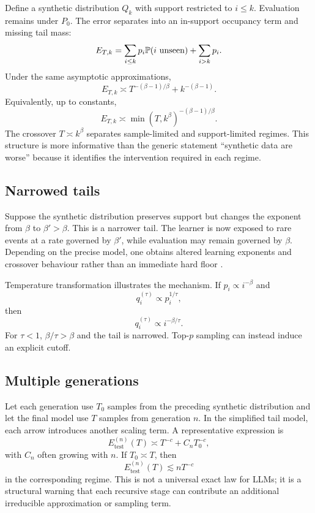 Define a synthetic distribution $Q_k$ with support restricted to $i\le k$. Evaluation remains under $P_0$. The error separates into an in-support occupancy term and missing tail mass:
\[
E_{T,k}
= \sum_{i\le k}p_i\mathbb{P}(i\text{ unseen})
+ \sum_{i>k}p_i.
\]
Under the same asymptotic approximations,
\[
E_{T,k}
\asymp T^{-(\beta-1)/\beta}
+ k^{-(\beta-1)}.
\]
Equivalently, up to constants,
\[
E_{T,k}
\asymp \min(T,k^\beta)^{-(\beta-1)/\beta}.
\]
The crossover $T\asymp k^\beta$ separates sample-limited and support-limited regimes. This structure is more informative than the generic statement ``synthetic data are worse'' because it identifies the intervention required in each regime.

\subsection{Narrowed tails}

Suppose the synthetic distribution preserves support but changes the exponent from $\beta$ to $\beta'>\beta$. This is a narrower tail. The learner is now exposed to rare events at a rate governed by $\beta'$, while evaluation may remain governed by $\beta$. Depending on the precise model, one obtains altered learning exponents and crossover behaviour rather than an immediate hard floor \citep{dohmatob2024tails}.

Temperature transformation illustrates the mechanism. If $p_i\propto i^{-\beta}$ and
\[
q_i^{(\tau)}\propto p_i^{1/\tau},
\]
then
\[
q_i^{(\tau)}\propto i^{-\beta/\tau}.
\]
For $\tau<1$, $\beta/\tau>\beta$ and the tail is narrowed. Top-$p$ sampling can instead induce an explicit cutoff.

\subsection{Multiple generations}

Let each generation use $T_0$ samples from the preceding synthetic distribution and let the final model use $T$ samples from generation $n$. In the simplified tail model, each arrow introduces another scaling term. A representative expression is
\[
E_{\mathrm{test}}^{(n)}(T)
\asymp T^{-c} + C_n T_0^{-c},
\]
with $C_n$ often growing with $n$. If $T_0\asymp T$, then
\[
E_{\mathrm{test}}^{(n)}(T)\lesssim nT^{-c}
\]
in the corresponding regime. This is not a universal exact law for LLMs; it is a structural warning that each recursive stage can contribute an additional irreducible approximation or sampling term.

